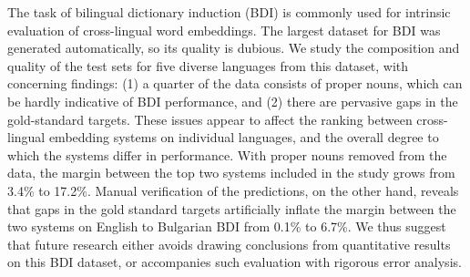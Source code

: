 The task of bilingual dictionary induction (BDI) is commonly used for intrinsic evaluation of cross-lingual word embeddings. The largest dataset for BDI was generated automatically, so its quality is dubious. 
We study the composition and quality of the test sets for five diverse languages from this dataset, with concerning findings: (1) a quarter of the data consists of proper nouns, which can be hardly indicative of BDI performance, and (2) there are pervasive gaps in the gold-standard targets. 
These issues appear to affect the ranking between cross-lingual embedding systems on individual languages, and the overall degree to which the systems differ in performance. With proper nouns removed from the data, the margin between the top two systems included in the study grows from 3.4\% to 17.2\%. Manual verification of the predictions, on the other hand, reveals that gaps in the gold standard targets artificially inflate the margin between the two systems on English to Bulgarian BDI from 0.1\% to 6.7\%. 
We thus suggest that future research either avoids drawing conclusions from quantitative results on this BDI dataset, or accompanies such evaluation with rigorous error analysis.